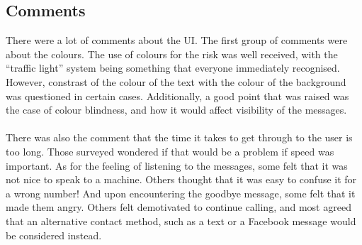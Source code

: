 \documentclass[main.tex]{subfiles}
\begin{document}
\subsection{Comments}
There were a lot of comments about the UI. The first group of comments were about the colours. The use of colours for the risk was well received, with the ``traffic light'' system being something that everyone immediately recognised. However, constrast of the colour of the text with the colour of the background was questioned in certain cases. Additionally, a good point that was raised was the case of colour blindness, and how it would affect visibility of the messages.
\\\\
There was also the comment that the time it takes to get through to the user is too long. Those surveyed wondered if that would be a problem if speed was important. As for the feeling of listening to the messages, some felt that it was not nice to speak to a machine. Others thought that it was easy to confuse it for a wrong number! And upon encountering the goodbye message, some felt that it made them angry. Others felt demotivated to continue calling, and most agreed that an alternative contact method, such as a text or a Facebook message would be considered instead.
\end{document}

